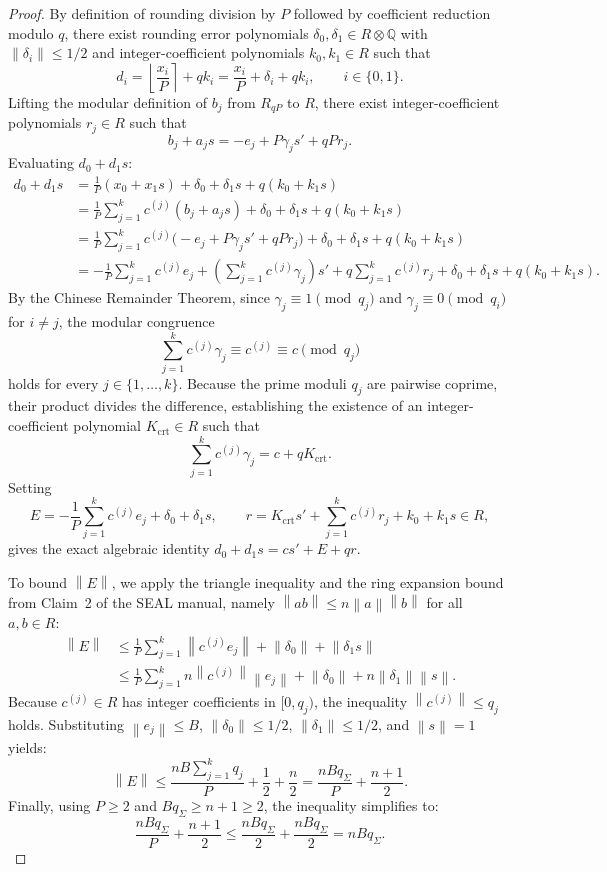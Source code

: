 \documentclass[11pt]{article}
\theoremstyle{definition}
\theoremstyle{remark}
\newcommand{\norm}[1]{\left\lVert #1\right\rVert}
\begin{document}
\begin{proof}
By definition of rounding division by $P$ followed by coefficient reduction modulo $q$, there exist rounding error polynomials $\delta_0, \delta_1 \in R \otimes \mathbb{Q}$ with $\norm{\delta_i} \leq 1/2$ and integer-coefficient polynomials $k_0, k_1 \in R$ such that
\[
  d_i = \left\lfloor \frac{x_i}{P} \right\rceil + q k_i = \frac{x_i}{P} + \delta_i + q k_i, \qquad i \in \{0, 1\}.
\]
Lifting the modular definition of $b_j$ from $R_{qP}$ to $R$, there exist integer-coefficient polynomials $r_j \in R$ such that
\[
  b_j + a_j s = -e_j + P \gamma_j s' + q P r_j.
\]
Evaluating $d_0 + d_1 s$:
\begin{align*}
  d_0 + d_1 s
  &= \frac{1}{P}(x_0 + x_1 s) + \delta_0 + \delta_1 s + q(k_0 + k_1 s)\\
  &= \frac{1}{P}\sum_{j=1}^k c^{(j)}(b_j + a_j s) + \delta_0 + \delta_1 s + q(k_0 + k_1 s)\\
  &= \frac{1}{P}\sum_{j=1}^k c^{(j)}\bigl(-e_j + P \gamma_j s' + q P r_j\bigr) + \delta_0 + \delta_1 s + q(k_0 + k_1 s)\\
  &= -\frac{1}{P}\sum_{j=1}^k c^{(j)} e_j + \left(\sum_{j=1}^k c^{(j)} \gamma_j\right) s' + q \sum_{j=1}^k c^{(j)} r_j + \delta_0 + \delta_1 s + q(k_0 + k_1 s).
\end{align*}
By the Chinese Remainder Theorem, since $\gamma_j \equiv 1 \pmod{q_j}$ and $\gamma_j \equiv 0 \pmod{q_i}$ for $i \neq j$, the modular congruence
\[
  \sum_{j=1}^k c^{(j)} \gamma_j \equiv c^{(j)} \equiv c \pmod{q_j}
\]
holds for every $j \in \{1, \dots, k\}$.
Because the prime moduli $q_j$ are pairwise coprime, their product divides the difference, establishing the existence of an integer-coefficient polynomial $K_{\mathrm{crt}} \in R$ such that
\[
  \sum_{j=1}^k c^{(j)} \gamma_j = c + q K_{\mathrm{crt}}.
\]
Setting
\[
  E = -\frac{1}{P}\sum_{j=1}^k c^{(j)} e_j + \delta_0 + \delta_1 s, \qquad r = K_{\mathrm{crt}} s' + \sum_{j=1}^k c^{(j)} r_j + k_0 + k_1 s \in R,
\]
gives the exact algebraic identity $d_0 + d_1 s = c s' + E + q r$.

To bound $\norm{E}$, we apply the triangle inequality and the ring expansion bound from Claim~2 of the SEAL manual, namely $\norm{ab} \leq n\norm{a}\norm{b}$ for all $a, b \in R$:
\begin{align*}
  \norm{E}
  &\leq \frac{1}{P}\sum_{j=1}^k \norm{c^{(j)} e_j} + \norm{\delta_0} + \norm{\delta_1 s}\\
  &\leq \frac{1}{P}\sum_{j=1}^k n \norm{c^{(j)}} \norm{e_j} + \norm{\delta_0} + n \norm{\delta_1} \norm{s}.
\end{align*}
Because $c^{(j)} \in R$ has integer coefficients in $[0, q_j)$, the inequality $\norm{c^{(j)}} \leq q_j$ holds.
Substituting $\norm{e_j} \leq B$, $\norm{\delta_0} \leq 1/2$, $\norm{\delta_1} \leq 1/2$, and $\norm{s} = 1$ yields:
\[
  \norm{E} \leq \frac{n B \sum_{j=1}^k q_j}{P} + \frac{1}{2} + \frac{n}{2} = \frac{n B q_\Sigma}{P} + \frac{n+1}{2}.
\]
Finally, using $P \geq 2$ and $B q_\Sigma \geq n+1 \geq 2$, the inequality simplifies to:
\[
  \frac{n B q_\Sigma}{P} + \frac{n+1}{2} \leq \frac{n B q_\Sigma}{2} + \frac{n B q_\Sigma}{2} = n B q_\Sigma.
\]
\end{proof}
\end{document}
